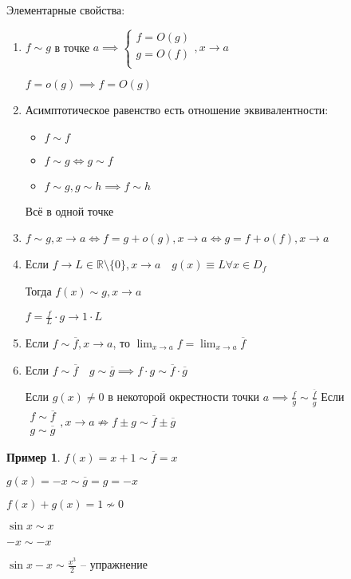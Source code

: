 \documentclass{book}
\newcommand\R{\ensuremath{\mathbb{R}}}
\newcommand{\ov}[1]{\overline{#1}}
\theoremstyle{definition}
\newtheorem*{example}{Пример}
\begin{document}
Элементарные свойства:
\begin{enumerate}
    \item $f\sim g$  в точке $a \implies \begin{cases}
            f = O\left( g \right) \\
            g = O\left( f \right) \\
    \end{cases}, x\to a$ 

    $f = o(g) \implies f = O(g)$
    \item Асимптотическое равенство есть  отношение эквивалентности:
        \begin{itemize}
            \item $f\sim f$
            \item $f\sim g \iff  g\sim f$\\
            \item $f\sim g, g\sim h \implies f\sim h$
        \end{itemize}

        Всё в одной точке
    \item $f\sim g, x\to a \iff f = g + o(g), x\to a \iff g = f + o(f), x\to a$
    \item Если $f\to L\in \R\setminus \{0\}, x\to a\quad g(x)\equiv L \forall x\in D_f$

        Тогда $f(x) \sim g, x\to a$

        $f = \frac{f}{L}\cdot g \to 1\cdot L$ 
    \item Если $f\sim \ov f, x\to a$, то $\lim_{x \to a} f = \lim_{x \to a} \ov f$
    \item Если $f\sim \ov f\quad g\sim \ov g \implies f\cdot g\sim \ov f \cdot  \ov g$

        Если $g(x)\neq 0$  в некоторой окрестности точки $a\implies \frac{f}{g}\sim \frac{\ov f}{\ov g}$
        Если $\begin{array}{c}
            f\sim \ov f\\
            g\sim \ov g
        \end{array}, x\to a \nRightarrow f\pm g \sim \ov f\pm \ov g $
\end{enumerate}

\begin{example}
    $f(x) = x+1 \sim \ov f = x$

    $g(x) = -x\sim \ov g = g = -x$

    $f(x) + g(x) = 1\not\sim 0$

    $\sin x\sim x$

    $-x\sim -x$

    $\sin x-x\sim \frac{x^3}{2}$ -- упражнение
\end{example}
\end{document}
